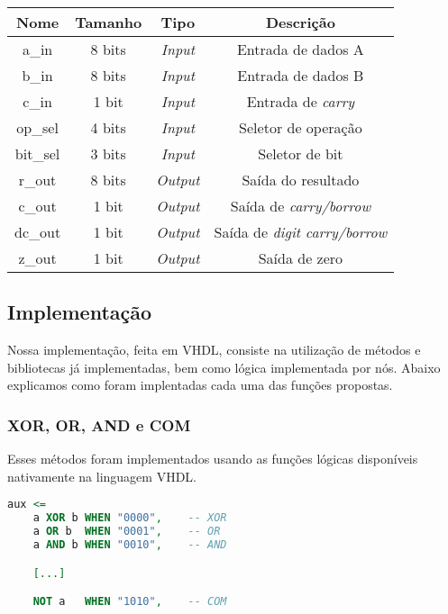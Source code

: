\documentclass{article}
\begin{document}
\begin{center}
\begin{tabular}{|c|c|c|c|}
    \hline
    Nome & Tamanho & Tipo & Descrição\\
    \hline
    a\_in & 8 bits & \textit{Input} & Entrada de dados A\\
    \hline
    b\_in & 8 bits & \textit{Input} & Entrada de dados B\\
    \hline
    c\_in & 1 bit & \textit{Input} & Entrada de \textit{carry}\\
    \hline
    op\_sel & 4 bits & \textit{Input} & Seletor de operação\\
    \hline
    bit\_sel & 3 bits & \textit{Input} & Seletor de bit\\
    \hline
    r\_out & 8 bits & \textit{Output} & Saída do resultado\\
    \hline
    c\_out & 1 bit & \textit{Output} & Saída de \textit{carry/borrow}\\
    \hline
    dc\_out & 1 bit & \textit{Output} & Saída de \textit{digit carry/borrow}\\
    \hline
    z\_out & 1 bit & \textit{Output} & Saída de zero\\
    \hline
\end{tabular}
\end{center}

\subsection{Implementação}

Nossa implementação, feita em VHDL, consiste na utilização de métodos e bibliotecas já implementadas, bem como lógica implementada por nós. Abaixo explicamos como foram implentadas cada uma das funções propostas.

\subsubsection{XOR, OR, AND e COM}

Esses métodos foram implementados usando as funções lógicas disponíveis nativamente na linguagem VHDL.

\begin{lstlisting}[language=VHDL]
aux <=
    a XOR b WHEN "0000",    -- XOR
    a OR b  WHEN "0001",    -- OR
    a AND b WHEN "0010",    -- AND

    [...]

    NOT a   WHEN "1010",    -- COM
\end{lstlisting}
\end{document}
